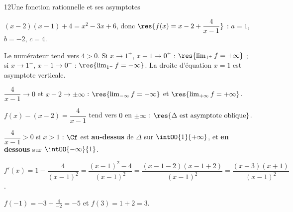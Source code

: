 \begin{corrige}{12}{Une fonction rationnelle et ses asymptotes}
\begin{questions}
  \item $(x-2)(x-1)+4=x^{2}-3x+6$, donc $\res{f(x)=x-2+\dfrac{4}{x-1}}$ : $a=1$, $b=-2$, $c=4$.
  \item Le numérateur tend vers $4>0$. Si $x\to1^{+}$, $x-1\to0^{+}$ : $\res{\lim_{1^{+}}f=+\infty}$ ;
    si $x\to1^{-}$, $x-1\to0^{-}$ : $\res{\lim_{1^{-}}f=-\infty}$. La droite d'équation $x=1$ est asymptote verticale.
  \item $\dfrac{4}{x-1}\to0$ et $x-2\to\pm\infty$ : $\res{\lim_{-\infty}f=-\infty}$ et $\res{\lim_{+\infty}f=+\infty}$.
  \item $f(x)-(x-2)=\dfrac{4}{x-1}$ tend vers $0$ en $\pm\infty$ : $\res{\Delta\text{ est asymptote oblique}}$.
  \item $\dfrac{4}{x-1}>0$ si $x>1$ : $\Cf$ est \textbf{au-dessus} de $\Delta$ sur $\intOO{1}{+\infty}$, et
    \textbf{en dessous} sur $\intOO{-\infty}{1}$.
\end{questions}
\begin{questions}[resume]
  \item $f'(x)=1-\dfrac{4}{(x-1)^{2}}=\dfrac{(x-1)^{2}-4}{(x-1)^{2}}=\dfrac{(x-1-2)(x-1+2)}{(x-1)^{2}}=\dfrac{(x-3)(x+1)}{(x-1)^{2}}$.
  \item $f(-1)=-3+\frac{4}{-2}=-5$ et $f(3)=1+2=3$.
\end{questions}
\begin{center}
\begin{tableau}
\end{tableau}
\end{center}
\begin{center}
\end{center}
\end{corrige}
